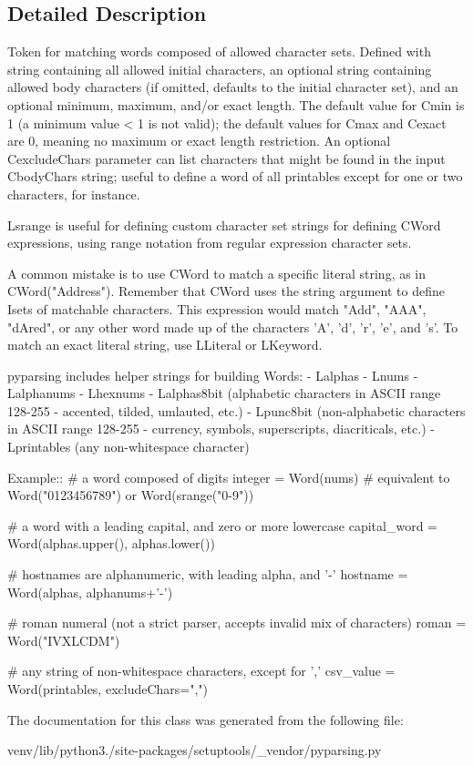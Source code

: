 \subsection{Detailed Description}
\begin{DoxyVerb}Token for matching words composed of allowed character sets.
Defined with string containing all allowed initial characters,
an optional string containing allowed body characters (if omitted,
defaults to the initial character set), and an optional minimum,
maximum, and/or exact length.  The default value for C{min} is 1 (a
minimum value < 1 is not valid); the default values for C{max} and C{exact}
are 0, meaning no maximum or exact length restriction. An optional
C{excludeChars} parameter can list characters that might be found in 
the input C{bodyChars} string; useful to define a word of all printables
except for one or two characters, for instance.

L{srange} is useful for defining custom character set strings for defining 
C{Word} expressions, using range notation from regular expression character sets.

A common mistake is to use C{Word} to match a specific literal string, as in 
C{Word("Address")}. Remember that C{Word} uses the string argument to define
I{sets} of matchable characters. This expression would match "Add", "AAA",
"dAred", or any other word made up of the characters 'A', 'd', 'r', 'e', and 's'.
To match an exact literal string, use L{Literal} or L{Keyword}.

pyparsing includes helper strings for building Words:
 - L{alphas}
 - L{nums}
 - L{alphanums}
 - L{hexnums}
 - L{alphas8bit} (alphabetic characters in ASCII range 128-255 - accented, tilded, umlauted, etc.)
 - L{punc8bit} (non-alphabetic characters in ASCII range 128-255 - currency, symbols, superscripts, diacriticals, etc.)
 - L{printables} (any non-whitespace character)

Example::
    # a word composed of digits
    integer = Word(nums) # equivalent to Word("0123456789") or Word(srange("0-9"))
    
    # a word with a leading capital, and zero or more lowercase
    capital_word = Word(alphas.upper(), alphas.lower())

    # hostnames are alphanumeric, with leading alpha, and '-'
    hostname = Word(alphas, alphanums+'-')
    
    # roman numeral (not a strict parser, accepts invalid mix of characters)
    roman = Word("IVXLCDM")
    
    # any string of non-whitespace characters, except for ','
    csv_value = Word(printables, excludeChars=",")
\end{DoxyVerb}
 

The documentation for this class was generated from the following file\+:\begin{DoxyCompactItemize}
\item 
venv/lib/python3./site-\/packages/setuptools/\+\_\+vendor/pyparsing.\+py\end{DoxyCompactItemize}

